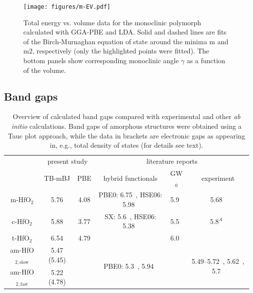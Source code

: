 \documentclass[10pt,a4paper,twocolumn]{article}
\begin{document}
\begin{figure}
\begin{center}
	\texttt{[image: figures/m-EV.pdf]}
	\caption{Total energy vs. volume data for the monoclinic polymorph calculated with GGA-PBE and LDA. Solid and dashed lines are fits of the Birch-Murnaghan equation of state around the minima m and m2, respectively (only the highlighted points were fitted). The bottom panels show corresponding  monoclinic angle $\gamma$ as a function of the volume.}
   \label{EV}
\end{center}
\end{figure}

\subsection{Band gaps}

\begin{table}
\begin{center}

\begin{tabular}{c|cc|ccc}
& \multicolumn{2}{c|}{present study} & \multicolumn{3}{c}{literature reports}\\
			& TB-mBJ  & PBE & hybrid functionals & GW$_0$ & experiment \\
\hline
m-HfO$_2$ &	5.76 & 4.08 & PBE0: 6.75~\cite{Komsa2010}, HSE06: 5.98~\cite{Komsa2010} & 5.9~\cite{Gruning2010} & 5.68~\cite{Balog1977} \\
c-HfO$_2$ &	5.88 & 3.77 & SX: 5.6~\cite{Clark2010}, HSE06: 5.38~\cite{Yang2014} & 5.5~\cite{Gruning2010} & 5.8$^A$~\cite{Lim2002}\\
t-HfO$_2$ &	6.54 & 4.79 &  & 6.0~\cite{Gruning2010} & \\
am-HfO$_{2,\mathrm{slow}}$ & 5.47 (5.45) & & \multirow{2}{*}{PBE0: 5.3~\cite{Broqvist2007}, 5.94~\cite{Chen2011}} &  & \multirow{2}{*}{5.49--5.72~\cite{Takeuchi2004}, 5.62~\cite{Nguyen2005}, 5.7~\cite{Perevalov2007}}\\
am-HfO$_{2,\mathrm{fast}}$ & 5.22 (4.78) & &  &  & \\

\end{tabular}
\caption{Overview of calculated band gaps compared with experimental and other \textit{ab initio} calculations. Band gaps of amorphous structures were obtained using a Tauc plot approach, while the data in brackets are electronic gaps as appearing in, e.g., total density of states (for details see text).}
\label{gaps}
\end{center}
\end{table}
\end{document}
